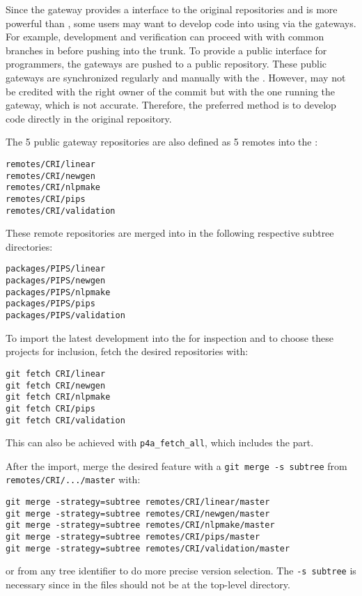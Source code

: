 \documentclass[a4paper]{article}
\begin{document}
Since the gateway provides a \Agit interface to the original \Apips{} \Asvn
repositories and \Agit is more powerful than \Asvn, some users may
want to develop code into \Apips using \Agit via the gateways. For
example, development and verification can proceed with with common
branches in \Agit before pushing into the \Apips{} \Asvn trunk. To provide
a public interface for programmers, the \Agit gateways are pushed to a public
\Agit repository. These public gateways are synchronized regularly and
manually with the \Apips{} \Asvn. However,
\Asvn may not be credited with the right owner of the commit but with the
one running the gateway, which is not accurate. Therefore, the
preferred method is to
develop code directly in the original \Apips \Asvn repository.

The 5 public gateway \Agit repositories are also defined as 5 remotes into
the \Apfa{} \Agit:
\begin{description}
\item[\texttt{remotes/CRI/linear}]
\item[\texttt{remotes/CRI/newgen}]
\item[\texttt{remotes/CRI/nlpmake}]
\item[\texttt{remotes/CRI/pips}]
\item[\texttt{remotes/CRI/validation}]
\end{description}

These remote repositories are merged into \Apfa in the following
respective subtree directories:
\begin{description}
\item[\texttt{packages/PIPS/linear}]
\item[\texttt{packages/PIPS/newgen}]
\item[\texttt{packages/PIPS/nlpmake}]
\item[\texttt{packages/PIPS/pips}]
\item[\texttt{packages/PIPS/validation}]
\end{description}

To import the latest \Apips development into the \Apfa{} \Agit for
inspection and to choose these projects for inclusion, fetch the
desired repositories with:
\begin{verbatim}
git fetch CRI/linear
git fetch CRI/newgen
git fetch CRI/nlpmake
git fetch CRI/pips
git fetch CRI/validation
\end{verbatim}
This can also be achieved with \verb|p4a_fetch_all|, which includes the
\Apolylib part.

After the import, merge the desired feature with a \texttt{git merge -s
  subtree} from \texttt{remotes/CRI/.../master} with:
\begin{verbatim}
git merge -strategy=subtree remotes/CRI/linear/master
git merge -strategy=subtree remotes/CRI/newgen/master
git merge -strategy=subtree remotes/CRI/nlpmake/master
git merge -strategy=subtree remotes/CRI/pips/master
git merge -strategy=subtree remotes/CRI/validation/master
\end{verbatim}
or from any tree identifier to do more precise version selection. The
\texttt{-s subtree} is necessary since in \Apfa the \Apips files
should not be
at the top-level directory.
\end{document}
